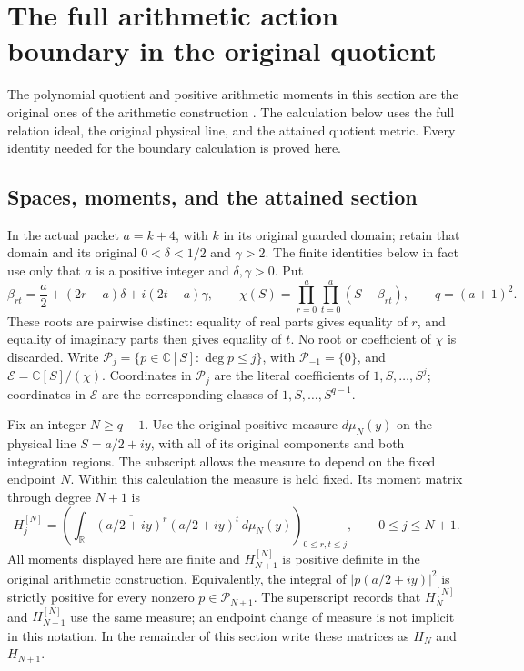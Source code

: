 \section{The full arithmetic action boundary in the original quotient}

The polynomial quotient and positive arithmetic moments in this section are
the original ones of the arithmetic construction
\cite{prog:arithmetic}.  The calculation below uses the full relation ideal,
the original physical line, and the attained quotient metric.  Every identity
needed for the boundary calculation is proved here.

\subsection{Spaces, moments, and the attained section}

In the actual packet \(a=k+4\), with \(k\) in its original guarded domain;
retain that domain and its original \(0<\delta<1/2\) and \(\gamma>2\).
The finite identities below in fact use only that \(a\) is a positive
integer and \(\delta,\gamma>0\).  Put
\begin{equation}
 \beta_{rt}=\frac a2+(2r-a)\delta+i(2t-a)\gamma,\qquad
 \chi(S)=\prod_{r=0}^{a}\prod_{t=0}^{a}(S-\beta_{rt}),\qquad
 q=(a+1)^2 .
 \tag{NAB1}\label{eq:NAB1}
\end{equation}
These roots are pairwise distinct: equality of real parts gives equality
of \(r\), and equality of imaginary parts then gives equality of \(t\).
No root or coefficient of \(\chi\) is discarded.  Write
\(\mathcal P_j=\{p\in\mathbb C[S]:\deg p\leq j\}\), with
\(\mathcal P_{-1}=\{0\}\), and
\(\mathcal E=\mathbb C[S]/(\chi)\).  Coordinates in
\(\mathcal P_j\) are the literal coefficients of
\(1,S,\ldots,S^j\); coordinates in \(\mathcal E\) are the corresponding
classes of \(1,S,\ldots,S^{q-1}\).

Fix an integer \(N\geq q-1\).  Use the original positive measure
\(d\mu_N(y)\) on the physical line \(S=a/2+iy\), with all of its original
components and both integration regions.  The subscript allows the measure
to depend on the fixed endpoint \(N\).  Within this calculation the measure
is held fixed.  Its moment matrix through degree \(N+1\) is
\begin{equation}
 H_j^{[N]}=
 \left(
 \int_{\mathbb R}
    \overline{(a/2+iy)^r}(a/2+iy)^t\,d\mu_N(y)
 \right)_{0\leq r,t\leq j},
 \qquad 0\leq j\leq N+1 .
 \tag{NAB2}\label{eq:NAB2}
\end{equation}
All moments displayed here are finite and \(H_{N+1}^{[N]}\) is positive
definite in the original arithmetic construction.  Equivalently, the
integral of \(|p(a/2+iy)|^2\) is strictly positive for every nonzero
\(p\in\mathcal P_{N+1}\).  The superscript records that
\(H_N^{[N]}\) and \(H_{N+1}^{[N]}\) use the same measure; an endpoint change
of measure is not implicit in this notation.  In the remainder of this
section write these matrices as \(H_N\) and \(H_{N+1}\).

